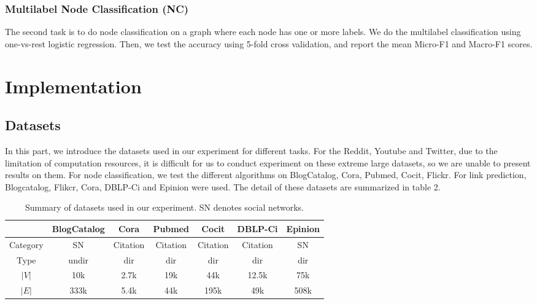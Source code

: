 \documentclass[a4paper]{article}
\begin{document}
\subsubsection{Multilabel Node Classification (NC)}

\noindent The second task is to do node classification on a graph where each node has one or more labels. We do the multilabel classification using one-vs-rest logistic regression. Then, we test the accuracy using 5-fold cross validation, and report the mean Micro-F1 and Macro-F1 scores.


\section{Implementation}

\subsection{Datasets}
\noindent In this part, we introduce the datasets \cite{nr-aaai15} used in our experiment for different tasks. For the Reddit, Youtube and Twitter, due to the limitation of computation resources, it is difficult for us to conduct experiment on these extreme large datasets, so we are unable to present results on them. For node classification, we test the different algorithms on BlogCatalog, Cora, Pubmed, Cocit, Flickr. For link prediction, Blogcatalog, Flikcr, Cora, DBLP-Ci and Epinion were used. The detail of these datasets are summarized in table 2.
\begin{table}[H]
    \centering
\begin{tabular}{c|c|c|c|c|c|c}
\toprule  
& BlogCatalog& Cora & Pubmed& Cocit &DBLP-Ci &Epinion\\
\midrule  
Category & SN& Citation&Citation&Citation&Citation &SN\\
Type& undir& dir & dir & dir & dir & dir\\
$|V|$ &10k &2.7k &19k &44k &12.5k & 75k\\
$|E|$ &333k & 5.4k &44k & 195k &49k &508k\\
\bottomrule 
\end{tabular}
\caption{Summary of datasets used in our experiment. SN denotes social networks.}
\end{table}
\end{document}
